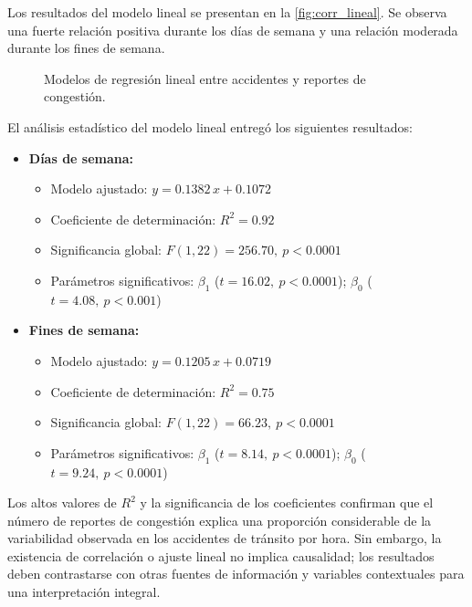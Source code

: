 \documentclass[12pt]{article}
\begin{document}
Los resultados del modelo lineal se presentan en la \autoref{fig:corr_lineal}.
Se observa una fuerte relación positiva durante los días de semana y una relación moderada durante los fines de semana.

\begin{figure}[H]
    \centering
    \newline
    \newline
    \caption{Modelos de regresión lineal entre accidentes y reportes de congestión.}
    \label{fig:corr_lineal}
\end{figure}

El análisis estadístico del modelo lineal entregó los siguientes resultados:

\begin{itemize}
    \item \textbf{Días de semana:}
    \begin{itemize}
        \item Modelo ajustado: \( y = 0.1382\,x + 0.1072 \)
        \item Coeficiente de determinación: \( R^2 = 0.92 \)
        \item Significancia global: \( F(1, 22) = 256.70,\ p < 0.0001 \)
        \item Parámetros significativos: \( \beta_1 \) (\(t = 16.02,\ p < 0.0001\)); \( \beta_0 \) (\(t = 4.08,\ p < 0.001\))
    \end{itemize}

    \item \textbf{Fines de semana:}
    \begin{itemize}
        \item Modelo ajustado: \( y = 0.1205\,x + 0.0719 \)
        \item Coeficiente de determinación: \( R^2 = 0.75 \)
        \item Significancia global: \( F(1, 22) = 66.23,\ p < 0.0001 \)
        \item Parámetros significativos: \( \beta_1 \) (\(t = 8.14,\ p < 0.0001\)); \( \beta_0 \) (\(t = 9.24,\ p < 0.0001\))
    \end{itemize}
\end{itemize}

Los altos valores de \(R^2\) y la significancia de los coeficientes confirman que el número de reportes de congestión explica una proporción considerable de la variabilidad observada en los accidentes de tránsito por hora.
Sin embargo, la existencia de correlación o ajuste lineal no implica causalidad; los resultados deben contrastarse con otras fuentes de información y variables contextuales para una interpretación integral.
\end{document}
